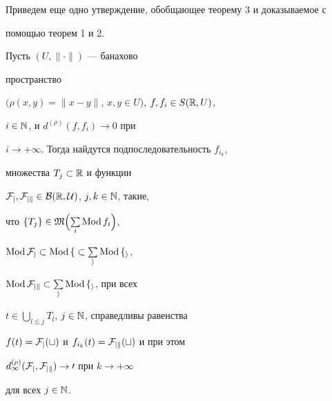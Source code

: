 




Приведем еще одно утверждение, обобщающее теорему 3 и доказываемое с


помощью теорем 1 и 2.





\begin{thm} Пусть $(U,\|\cdot\|)$ --- банахово


пространство


$(\rho(x,y)=\|x-y\|$, $x,y\in U)$, $f,f_i\in S(\Bbb R,U)$,


$i\in\Bbb N$, и $d^{(\rho)}(f,f_i)\to 0$ при


$i\to+\infty$. Тогда найдутся подпоследовательность $f_{i_k}$,


множества $T_j\subset\Bbb R$ и функции


$\cal F_j,\cal F_{jk}\in B(\Bbb R,U)$, $j,k\in\Bbb N$, такие,


что $\{T_j\}\in\frak M\Bigl(\sum\limits_i\operatorname{Mod} f_i\Bigr)$,


$\operatorname{Mod}\cal F_j\subset\operatorname{Mod} f\subset\sum\limits_i\operatorname{Mod} f_i$,


$\operatorname{Mod}\cal F_{jk}\subset\sum\limits_i\operatorname{Mod} f_i$, при всех


$t\in\bigcup\limits_{l\le j}T_l$, $j\in\Bbb N$, справедливы равенства


$f(t)=\cal F_j(t)$ и $f_{i_k}(t)=\cal F_{jk}(t)$ и при этом


$d^{(\rho)}_\infty(\cal F_j,\cal F_{jk})\to 0$ при $k\to+\infty$


для всех $j\in\Bbb N$.


\end{thm}





